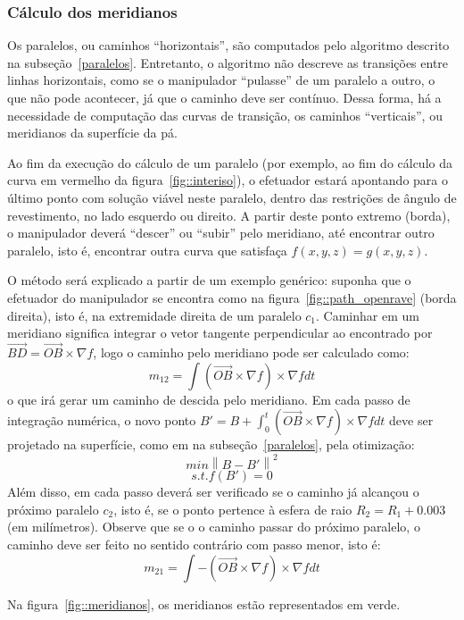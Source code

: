 \subsubsection{Cálculo dos meridianos}
Os paralelos, ou caminhos ``horizontais'', são computados pelo algoritmo
descrito na subseção~\ref{paralelos}. Entretanto, o algoritmo não descreve as
transições entre linhas horizontais, como se o manipulador ``pulasse''
de um paralelo a outro, o que não pode acontecer, já que o caminho deve ser
contínuo. Dessa forma, há a necessidade de computação das curvas de transição,
os caminhos ``verticais'', ou meridianos da superfície da pá.

Ao fim da execução do cálculo de um paralelo (por exemplo, ao fim do
cálculo da curva em vermelho da figura~\ref{fig::interiso}), o
efetuador estará apontando para o último ponto com solução viável neste
paralelo, dentro das restrições de ângulo de revestimento, no lado esquerdo ou direito. A partir
deste ponto extremo (borda), o manipulador deverá ``descer'' ou ``subir'' pelo
meridiano, até encontrar outro paralelo, isto é, encontrar outra curva que
satisfaça $f(x,y,z)=g(x,y,z)$.

O método será explicado a partir de um exemplo genérico: suponha que o efetuador
do manipulador se encontra como na figura~\ref{fig::path_openrave} (borda
direita), isto é, na extremidade direita de um paralelo $c_1$. Caminhar em um
meridiano significa integrar o vetor tangente perpendicular ao encontrado por $\vec{BD} = \vec{OB} \times
\nabla{f}$, logo o caminho pelo meridiano pode ser calculado
como:
$$m_{12} = \int (\vec{OB} \times \nabla{f})\times \nabla{f} dt$$
o que irá gerar um caminho de descida pelo meridiano. Em cada passo de
integração numérica, o novo ponto $B' = B + \int_0^t (\vec{OB} \times
\nabla{f})\times \nabla{f} dt$ deve ser projetado na superfície, como em
na subseção~\ref{paralelos}, pela otimização:
$$min \left \| B-B' \right \|^2$$
$$s.t. f(B')=0$$
Além disso, em cada passo deverá ser verificado se o caminho já alcançou o
próximo paralelo $c_2$, isto é, se o ponto pertence à esfera de raio
$R_2=R_1+0.003$ (em milímetros). Observe que se o o caminho passar do próximo
paralelo, o caminho deve ser feito no sentido contrário com passo menor, isto é:
$$m_{21} = \int -(\vec{OB} \times \nabla{f})\times \nabla{f} dt$$

Na figura~\ref{fig::meridianos}, os meridianos estão representados em verde.

